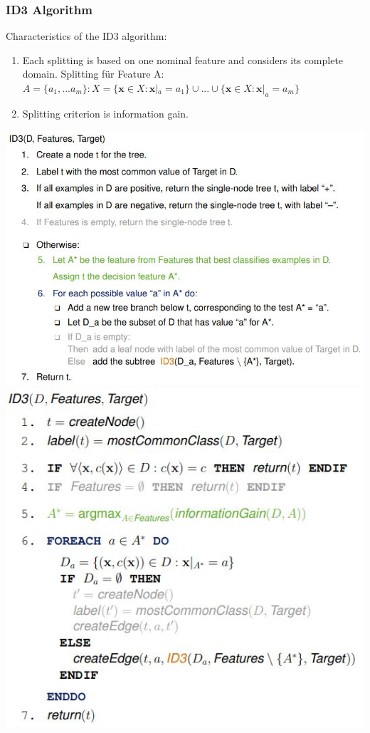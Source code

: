 \documentclass[11pt,a4paper]{article}
\begin{document}
\begin{flushleft}
\subsubsection{ID3 Algorithm}
Characteristics of the ID3 algorithm:
\begin{enumerate}
\item Each splitting is based on one nominal feature and considers its complete
domain. Splitting für Feature A: $A = \{a_1,...a_m\}: X = \{\textbf{x} \in X: \textbf{x}|_a = a_1 \} \cup ... \cup \{\textbf{x} \in X: \textbf{x}|_a = a_m \} $
\item Splitting criterion is information gain.
\end{enumerate}
\includegraphics[width = \textwidth]{ID3Text}
\includegraphics[width = \textwidth]{ID3}

\end{flushleft}
\end{document}
